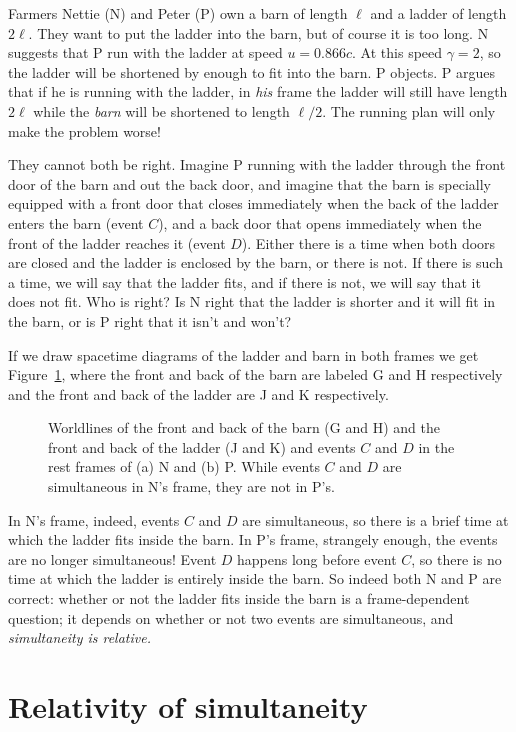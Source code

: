 Farmers Nettie (N) and Peter (P) own a barn of length $\ell$ and a
ladder of length $2\ell$.  They want to put the ladder into the barn,
but of course it is too long.  N suggests that P run with the ladder
at speed $u =0.866c$.  At this speed $\gamma =2$, so the ladder will
be shortened by enough to fit into the barn.  P objects.  P argues
that if he is running with the ladder, in {\em his\/} frame the ladder
will still have length $2\ell$ while the {\em barn\/} will be
shortened to length $\ell/2$.  The running plan will only make the
problem worse!

They cannot both be right.  Imagine P running with the ladder through
the front door of the barn and out the back door, and imagine that the
barn is specially equipped with a front door that closes immediately
when the back of the ladder enters the barn (event $C$), and a back
door that opens immediately when the front of the ladder reaches it
(event $D$).  Either there is a time when both doors are closed and
the ladder is enclosed by the barn, or there is not.  If there is such
a time, we will say that the ladder fits, and if there is not, we will
say that it does not fit.  Who is right?  Is N right that the ladder
is shorter and it will fit in the barn, or is P right that it isn't
and won't?

If we draw spacetime diagrams of the ladder and barn in both frames we
get Figure~\ref{fig:ladder1}, where the front and back of
the barn are labeled G and H respectively and the front and back of the
ladder are J and K respectively.
\begin{figure}
\caption[The ladder and barn in both frames]{Worldlines of the front
and back of the barn (G and H) and the front and back of the ladder (J
and K) and events $C$ and $D$ in the rest frames of (a) N and (b) P.
While events $C$ and $D$ are simultaneous in N's frame, they are not
in P's.}
\label{fig:ladder1}
\end{figure}
In N's frame, indeed, events $C$ and $D$ are simultaneous, so there is
a brief time at which the ladder fits inside the barn.  In P's frame,
strangely enough, the events are no longer simultaneous!  Event $D$
happens long before event $C$, so there is no time at which the ladder
is entirely inside the barn.  So indeed both N and P are correct:
whether or not the ladder fits inside the barn is a frame-dependent
question; it depends on whether or not two events are simultaneous,
and {\em simultaneity is relative.\/}


\section{Relativity of simultaneity}
\label{sec:relofsimul}

